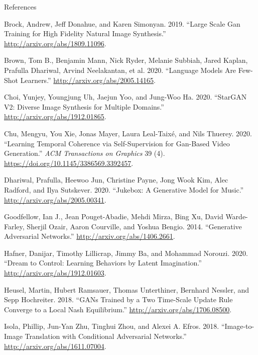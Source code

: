\begin{frame}[allowframebreaks]{References}
\protect\hypertarget{references}{}

\hypertarget{refs}{}
\leavevmode\hypertarget{ref-brock2019large}{}%
Brock, Andrew, Jeff Donahue, and Karen Simonyan. 2019. ``Large Scale Gan
Training for High Fidelity Natural Image Synthesis.''
\url{http://arxiv.org/abs/1809.11096}.

\leavevmode\hypertarget{ref-brown2020language}{}%
Brown, Tom B., Benjamin Mann, Nick Ryder, Melanie Subbiah, Jared Kaplan,
Prafulla Dhariwal, Arvind Neelakantan, et al. 2020. ``Language Models
Are Few-Shot Learners.'' \url{http://arxiv.org/abs/2005.14165}.

\leavevmode\hypertarget{ref-choi2020stargan}{}%
Choi, Yunjey, Youngjung Uh, Jaejun Yoo, and Jung-Woo Ha. 2020. ``StarGAN
V2: Diverse Image Synthesis for Multiple Domains.''
\url{http://arxiv.org/abs/1912.01865}.

\leavevmode\hypertarget{ref-Chu_2020}{}%
Chu, Mengyu, You Xie, Jonas Mayer, Laura Leal-Taixé, and Nils Thuerey.
2020. ``Learning Temporal Coherence via Self-Supervision for Gan-Based
Video Generation.'' \emph{ACM Transactions on Graphics} 39 (4).
\url{https://doi.org/10.1145/3386569.3392457}.

\leavevmode\hypertarget{ref-dhariwal2020jukebox}{}%
Dhariwal, Prafulla, Heewoo Jun, Christine Payne, Jong Wook Kim, Alec
Radford, and Ilya Sutskever. 2020. ``Jukebox: A Generative Model for
Music.'' \url{http://arxiv.org/abs/2005.00341}.

\leavevmode\hypertarget{ref-goodfellow2014generative}{}%
Goodfellow, Ian J., Jean Pouget-Abadie, Mehdi Mirza, Bing Xu, David
Warde-Farley, Sherjil Ozair, Aaron Courville, and Yoshua Bengio. 2014.
``Generative Adversarial Networks.''
\url{http://arxiv.org/abs/1406.2661}.

\leavevmode\hypertarget{ref-hafner2020dream}{}%
Hafner, Danijar, Timothy Lillicrap, Jimmy Ba, and Mohammad Norouzi.
2020. ``Dream to Control: Learning Behaviors by Latent Imagination.''
\url{http://arxiv.org/abs/1912.01603}.

\leavevmode\hypertarget{ref-heusel2018gans}{}%
Heusel, Martin, Hubert Ramsauer, Thomas Unterthiner, Bernhard Nessler,
and Sepp Hochreiter. 2018. ``GANs Trained by a Two Time-Scale Update
Rule Converge to a Local Nash Equilibrium.''
\url{http://arxiv.org/abs/1706.08500}.

\leavevmode\hypertarget{ref-isola2018imagetoimage}{}%
Isola, Phillip, Jun-Yan Zhu, Tinghui Zhou, and Alexei A. Efros. 2018.
``Image-to-Image Translation with Conditional Adversarial Networks.''
\url{http://arxiv.org/abs/1611.07004}.


\end{frame}
